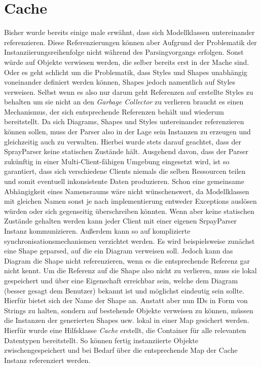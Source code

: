 \section{Cache}Bisher wurde bereits einige male erwähnt, dass sich Modellklassen untereinander referenzieren. Diese Referenzierungen können aber Aufgrund der Problematik der Instanziierungsreihenfolge nicht während des Parsingvorgangs erfolgen. Sonst würde auf Objekte verwiesen werden, die selber bereits erst in der Mache sind.
Oder es geht schlicht um die Problematik, dass Styles und Shapes unabhängig voneinander definiert werden können, Shapes jedoch namentlich auf Styles verweisen. Selbst wenn es also nur darum geht Referenzen auf erstellte Styles zu behalten um sie nicht an den \textit{Garbage Collector} zu verlieren braucht es einen Mechanismus, der sich entsprechende Referenzen behält und wiederum bereitstellt. Da sich Diagrams, Shapes und Styles untereinander referenzieren können sollen, muss der Parser also in der Lage sein Instanzen zu erzeugen und gleichzeitig auch zu verwalten. Hierbei wurde stets darauf geachtet, dass der SprayParser keine statischen Zustände hält. Ausgehend davon, dass der Parser zukünftig in einer Multi-Client-fähigen Umgebung eingesetzt wird, ist so garantiert, dass sich verschiedene Clients niemals die selben Ressourcen teilen und somit eventuell inkonsistente Daten produzieren. Schon eine gemeinsame Abhängigkeit eines Namensraums wäre nicht wünschenswert, da Modellklassen mit gleichen Namen sonst je nach implementierung entweder Exceptions auslösen würden oder sich gegenseitig überschreiben könnten. Wenn aber keine statischen Zustände gehalten werden kann jeder Client mit einer eigenen SrpayParser Instanz kommunizieren. Außerdem kann so auf komplizierte synchronisationsmechanismen verzichtet werden. Es wird beispielsweise zunächst eine Shape geparsed, auf die ein Diagram verweisen soll. Jedoch kann das Diagram die Shape nicht referenzieren, wenn es die entsprechende Referenz gar nicht kennt. Um die Referenz auf die Shape also nicht zu verlieren, muss sie lokal gespeichert und über eine Eigenschaft erreichbar sein, welche dem Diagram (besser gesagt dem Benutzer) bekannt ist und möglichst eindeutig sein sollte. Hierfür bietet sich der Name der Shape an. Anstatt aber nun IDs in Form von Strings zu halten, sondern auf bestehende Objekte verweisen zu können, müssen die Instanzen der generierten Shapes usw. lokal in einer Map gesichert werden. Hierfür wurde eine Hilfsklasse \textit{Cache} erstellt, die Container für alle relevanten Datentypen bereitstellt. So können fertig instanziierte Objekte zwischengespeichert und bei Bedarf über die entsprechende Map der Cache Instanz referenziert werden.
